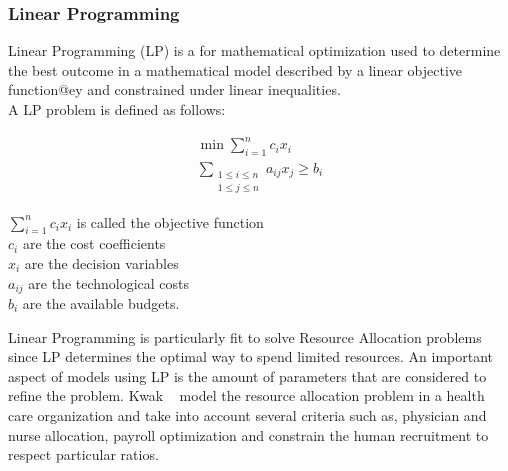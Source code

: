 \subsubsection{Linear Programming}


Linear Programming (LP) is a for mathematical optimization used to determine the best outcome in a mathematical model described by a linear objective function@ey and constrained under linear inequalities.
\\A LP problem is defined as follows:

\begin{myformula}
\begin{equation*}
    \begin{aligned}
    \min \sum\limits_{i=1}^n c_{i}x_i\\
    \sum_{\substack{1 \leqslant i \leqslant n \\  1 \leqslant j \leqslant n}} a_{ij}x_j \geqslant b_i
    \end{aligned}
\end{equation*}

$\sum\limits_{i=1}^n c_{i}x_i$ is called the objective function\\
$c_i$ are the cost coefficients\\
$x_i$ are the decision variables\\
$a_{ij}$ are the technological costs\\
$b_i$ are the available budgets.
\end{myformula}


Linear Programming is particularly fit to solve Resource Allocation problems since LP determines the optimal way to spend limited resources.
An important aspect of models using LP is the amount of parameters that are considered to refine the problem. 
Kwak \etal~\cite{lpmedical-kwak1997} model the resource allocation problem in a health care organization and take into account several criteria such as, physician and nurse allocation, payroll optimization and constrain the human recruitment to respect particular ratios.

